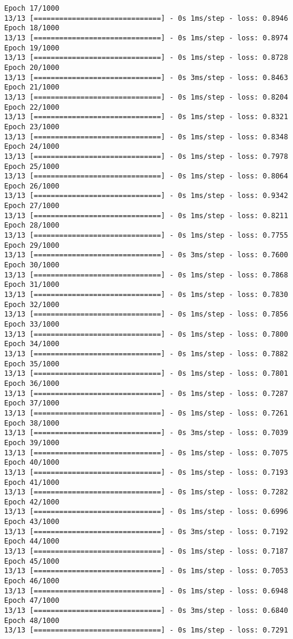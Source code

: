 \documentclass[11pt]{article}
\begin{document}
\begin{Verbatim}[commandchars=\\\{\}]
Epoch 17/1000
13/13 [==============================] - 0s 1ms/step - loss: 0.8946
Epoch 18/1000
13/13 [==============================] - 0s 1ms/step - loss: 0.8974
Epoch 19/1000
13/13 [==============================] - 0s 1ms/step - loss: 0.8728
Epoch 20/1000
13/13 [==============================] - 0s 3ms/step - loss: 0.8463
Epoch 21/1000
13/13 [==============================] - 0s 1ms/step - loss: 0.8204
Epoch 22/1000
13/13 [==============================] - 0s 1ms/step - loss: 0.8321
Epoch 23/1000
13/13 [==============================] - 0s 1ms/step - loss: 0.8348
Epoch 24/1000
13/13 [==============================] - 0s 1ms/step - loss: 0.7978
Epoch 25/1000
13/13 [==============================] - 0s 1ms/step - loss: 0.8064
Epoch 26/1000
13/13 [==============================] - 0s 1ms/step - loss: 0.9342
Epoch 27/1000
13/13 [==============================] - 0s 1ms/step - loss: 0.8211
Epoch 28/1000
13/13 [==============================] - 0s 1ms/step - loss: 0.7755
Epoch 29/1000
13/13 [==============================] - 0s 3ms/step - loss: 0.7600
Epoch 30/1000
13/13 [==============================] - 0s 1ms/step - loss: 0.7868
Epoch 31/1000
13/13 [==============================] - 0s 1ms/step - loss: 0.7830
Epoch 32/1000
13/13 [==============================] - 0s 1ms/step - loss: 0.7856
Epoch 33/1000
13/13 [==============================] - 0s 1ms/step - loss: 0.7800
Epoch 34/1000
13/13 [==============================] - 0s 1ms/step - loss: 0.7882
Epoch 35/1000
13/13 [==============================] - 0s 1ms/step - loss: 0.7801
Epoch 36/1000
13/13 [==============================] - 0s 1ms/step - loss: 0.7287
Epoch 37/1000
13/13 [==============================] - 0s 1ms/step - loss: 0.7261
Epoch 38/1000
13/13 [==============================] - 0s 3ms/step - loss: 0.7039
Epoch 39/1000
13/13 [==============================] - 0s 1ms/step - loss: 0.7075
Epoch 40/1000
13/13 [==============================] - 0s 1ms/step - loss: 0.7193
Epoch 41/1000
13/13 [==============================] - 0s 1ms/step - loss: 0.7282
Epoch 42/1000
13/13 [==============================] - 0s 1ms/step - loss: 0.6996
Epoch 43/1000
13/13 [==============================] - 0s 3ms/step - loss: 0.7192
Epoch 44/1000
13/13 [==============================] - 0s 1ms/step - loss: 0.7187
Epoch 45/1000
13/13 [==============================] - 0s 1ms/step - loss: 0.7053
Epoch 46/1000
13/13 [==============================] - 0s 1ms/step - loss: 0.6948
Epoch 47/1000
13/13 [==============================] - 0s 3ms/step - loss: 0.6840
Epoch 48/1000
13/13 [==============================] - 0s 1ms/step - loss: 0.7291

\end{Verbatim}
\end{document}
